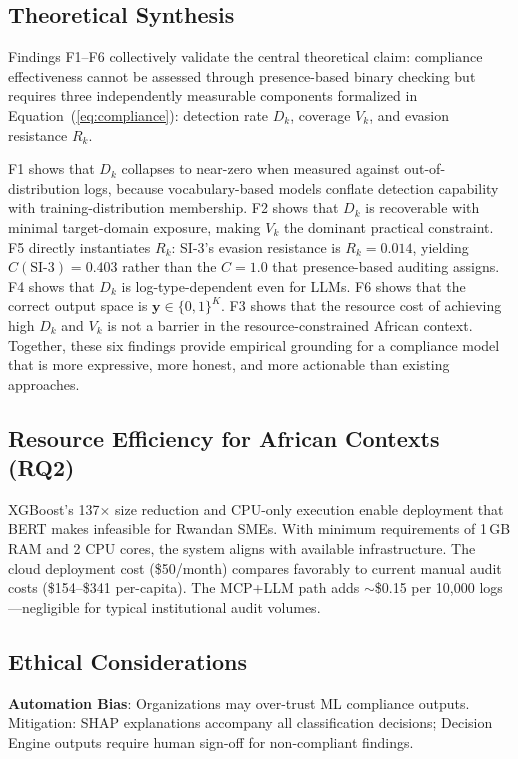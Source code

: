 \documentclass[futureinternet,article,submit,pdftex,moreauthors]{Definitions/mdpi}
\begin{document}
\subsection{Theoretical Synthesis}

Findings F1--F6 collectively validate the central theoretical claim: compliance effectiveness
cannot be assessed through presence-based binary checking but requires three independently
measurable components formalized in Equation~(\ref{eq:compliance}): detection rate $D_k$,
coverage $V_k$, and evasion resistance $R_k$.

F1 shows that $D_k$ collapses to near-zero when measured against out-of-distribution logs,
because vocabulary-based models conflate detection capability with training-distribution
membership. F2 shows that $D_k$ is recoverable with minimal target-domain exposure, making
$V_k$ the dominant practical constraint. F5 directly instantiates $R_k$: SI-3's evasion
resistance is $R_k = 0.014$, yielding $C(\text{SI-3}) = 0.403$ rather than the $C = 1.0$
that presence-based auditing assigns. F4 shows that $D_k$ is log-type-dependent even for
LLMs. F6 shows that the correct output space is $\mathbf{y} \in \{0,1\}^K$. F3 shows that
the resource cost of achieving high $D_k$ and $V_k$ is not a barrier in the
resource-constrained African context. Together, these six findings provide empirical grounding
for a compliance model that is more expressive, more honest, and more actionable than existing
approaches.

\subsection{Resource Efficiency for African Contexts (RQ2)}

XGBoost's 137$\times$ size reduction and CPU-only execution enable deployment that BERT
makes infeasible for Rwandan SMEs. With minimum requirements of 1\,GB RAM and 2 CPU cores,
the system aligns with available infrastructure. The cloud deployment cost (\$50/month)
compares favorably to current manual audit costs (\$154--\$341 per-capita). The MCP+LLM
path adds $\sim$\$0.15 per 10{,}000 logs---negligible for typical institutional audit volumes.

\subsection{Ethical Considerations}

\textbf{Automation Bias}: Organizations may over-trust ML compliance outputs. Mitigation:
SHAP explanations accompany all classification decisions; Decision Engine outputs require
human sign-off for non-compliant findings.
\end{document}
